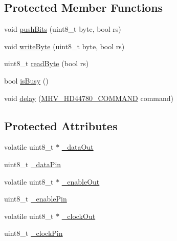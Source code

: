 \subsection*{\-Protected \-Member \-Functions}
\begin{DoxyCompactItemize}
\item 
void \hyperlink{class_m_h_v___display___h_d44780___shift___register_a24e29c1cec86368c3e42bdf871a6f68d}{push\-Bits} (uint8\-\_\-t byte, bool rs)
\item 
void \hyperlink{class_m_h_v___display___h_d44780___shift___register_a34da17fc30876b5be697c6515a9a8b29}{write\-Byte} (uint8\-\_\-t byte, bool rs)
\item 
uint8\-\_\-t \hyperlink{class_m_h_v___display___h_d44780___shift___register_aec4d12aa2c181aac3a21415fb1da26be}{read\-Byte} (bool rs)
\item 
bool \hyperlink{class_m_h_v___display___h_d44780___shift___register_afd3c1268215e5d8fd8e67c8c521d8e5c}{is\-Busy} ()
\item 
void \hyperlink{class_m_h_v___display___h_d44780___shift___register_a5f396630acf45e37a766ae9ae18b6508}{delay} (\hyperlink{_m_h_v___display___h_d44780_8h_a76bff68a0c366080486a09e3beec77e1}{\-M\-H\-V\-\_\-\-H\-D44780\-\_\-\-C\-O\-M\-M\-A\-N\-D} command)
\end{DoxyCompactItemize}
\subsection*{\-Protected \-Attributes}
\begin{DoxyCompactItemize}
\item 
volatile uint8\-\_\-t $\ast$ \hyperlink{class_m_h_v___display___h_d44780___shift___register_a1ef9590349f13740a07da6cde46f7501}{\-\_\-data\-Out}
\item 
uint8\-\_\-t \hyperlink{class_m_h_v___display___h_d44780___shift___register_aaaa37dbda3bf202fb52c9a3f56a2ebe8}{\-\_\-data\-Pin}
\item 
volatile uint8\-\_\-t $\ast$ \hyperlink{class_m_h_v___display___h_d44780___shift___register_a54c5007b675ae06da9e3301f8020137f}{\-\_\-enable\-Out}
\item 
uint8\-\_\-t \hyperlink{class_m_h_v___display___h_d44780___shift___register_a9dc7266b1f5940d91d7c374cc69c192d}{\-\_\-enable\-Pin}
\item 
volatile uint8\-\_\-t $\ast$ \hyperlink{class_m_h_v___display___h_d44780___shift___register_a466356fc79c931923a20003dec3cb051}{\-\_\-clock\-Out}
\item 
uint8\-\_\-t \hyperlink{class_m_h_v___display___h_d44780___shift___register_a166569c75b144383a553a35a10a60221}{\-\_\-clock\-Pin}
\end{DoxyCompactItemize}


